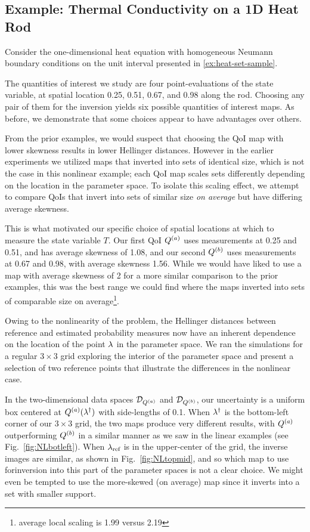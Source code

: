\subsection{Example: Thermal Conductivity on a 1D Heat Rod}\label{ex:heat-set-sample-accuracy}

Consider the one-dimensional heat equation with homogeneous Neumann boundary conditions on the unit interval presented in \ref{ex:heat-set-sample}.


The quantities of interest we study are four point-evaluations of the state variable, at spatial location 0.25, 0.51, 0.67, and 0.98 along the rod.
Choosing any pair of them for the inversion yields six possible quantities of interest maps.
As before, we demonstrate that some choices appear to have advantages over others.

From the prior examples, we would suspect that choosing the QoI map with lower skewness results in lower Hellinger distances.
However in the earlier experiments we utilized maps that inverted into sets of identical size, which is not the case in this nonlinear example; each QoI map scales sets differently depending on the location in the parameter space.
To isolate this scaling effect, we attempt to compare QoIs that invert into sets of similar size \emph{on average} but have differing average skewness.

This is what motivated our specific choice of spatial locations at which to measure the state variable $T$.
Our first QoI $Q^{(a)}$ uses measurements at 0.25 and 0.51, and has average skewness of 1.08, and our second $Q^{(b)}$ uses measurements at 0.67 and 0.98, with average skewness 1.56.
While we would have liked to use a map with average skewness of 2 for a more similar comparison to the prior examples, this was the best range we could find where the maps inverted into sets of comparable size on average\footnote{average local scaling is 1.99 versus 2.19}.

Owing to the nonlinearity of the problem, the Hellinger distances between reference and estimated probability measures now have an inherent dependence on the location of the point $\lambda$ in the parameter space.
We ran the simulations for a regular $3\times3$ grid exploring the interior of the parameter space and present a selection of two reference points that illustrate the differences in the nonlinear case.

In the two-dimensional data spaces $\mathcal{D}_{Q^{(a)}}$ and $\mathcal{D}_{Q^{(b)}}$, our uncertainty is a uniform box centered at $Q^{(a)}(\lambda^\dagger)$ with side-lengths of 0.1.
When $\lambda^\dagger$ is the bottom-left corner of our $3\times3$ grid, the two maps produce very different results, with $Q^{(a)}$ outperforming $Q^{(b)}$ in a similar manner as we saw in the linear examples (see Fig.~\ref{fig:NLbotleft}).
When $\lambda_{\text{ref}}$ is in the upper-center of the grid, the inverse images are similar, as shown in Fig.~\ref{fig:NLtopmid}, and so which map to use forinversion into this part of the parameter spaces is not a clear choice. We might even be tempted to use the more-skewed (on average) map since it inverts into a set with smaller support.


